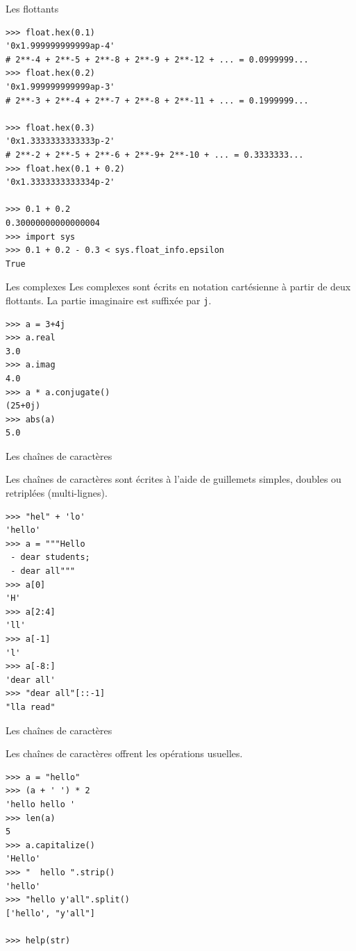 \documentclass[dvipsnames]{beamer}
\begin{document}
\begin{frame}
    [fragile]{Les flottants}

    \begin{verbatim}
>>> float.hex(0.1)
'0x1.999999999999ap-4'
# 2**-4 + 2**-5 + 2**-8 + 2**-9 + 2**-12 + ... = 0.0999999...
>>> float.hex(0.2)
'0x1.999999999999ap-3'
# 2**-3 + 2**-4 + 2**-7 + 2**-8 + 2**-11 + ... = 0.1999999...

>>> float.hex(0.3)
'0x1.3333333333333p-2'
# 2**-2 + 2**-5 + 2**-6 + 2**-9+ 2**-10 + ... = 0.3333333...
>>> float.hex(0.1 + 0.2)
'0x1.3333333333334p-2'

>>> 0.1 + 0.2
0.30000000000000004
>>> import sys
>>> 0.1 + 0.2 - 0.3 < sys.float_info.epsilon
True
\end{verbatim}
\end{frame}

\begin{frame}
    [fragile]{Les complexes}
    Les complexes sont écrits en notation cartésienne à partir de deux
    flottants. La partie imaginaire est suffixée par \texttt{j}.
    \begin{verbatim}
>>> a = 3+4j
>>> a.real
3.0
>>> a.imag
4.0
>>> a * a.conjugate()
(25+0j)
>>> abs(a)
5.0
\end{verbatim}


\end{frame}

\begin{frame}
    [fragile]{Les chaînes de caractères}

    Les chaînes de caractères sont écrites à l'aide de guillemets simples,
    doubles ou retriplées (multi-lignes).

    \begin{verbatim}
>>> "hel" + 'lo'
'hello'
>>> a = """Hello
 - dear students;
 - dear all"""
>>> a[0]
'H'
>>> a[2:4]
'll'
>>> a[-1]
'l'
>>> a[-8:]
'dear all'
>>> "dear all"[::-1]
"lla read"
\end{verbatim}
\end{frame}

\begin{frame}
    [fragile]{Les chaînes de caractères}

    Les chaînes de caractères offrent les opérations usuelles.
    \begin{verbatim}
>>> a = "hello"
>>> (a + ' ') * 2
'hello hello '
>>> len(a)
5
>>> a.capitalize()
'Hello'
>>> "  hello ".strip()
'hello'
>>> "hello y'all".split()
['hello', "y'all"]

>>> help(str)
\end{verbatim}
\end{frame}
\end{document}
